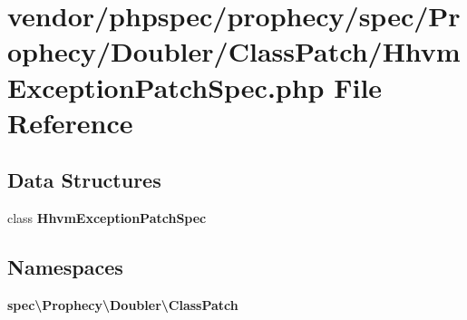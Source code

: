 \section{vendor/phpspec/prophecy/spec/\+Prophecy/\+Doubler/\+Class\+Patch/\+Hhvm\+Exception\+Patch\+Spec.php File Reference}
\label{_hhvm_exception_patch_spec_8php}
\subsection*{Data Structures}
\begin{DoxyCompactItemize}
\item 
class {\bf Hhvm\+Exception\+Patch\+Spec}
\end{DoxyCompactItemize}
\subsection*{Namespaces}
\begin{DoxyCompactItemize}
\item 
 {\bf spec\textbackslash{}\+Prophecy\textbackslash{}\+Doubler\textbackslash{}\+Class\+Patch}
\end{DoxyCompactItemize}
